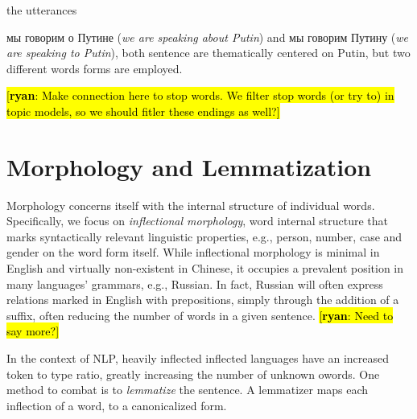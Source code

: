 \documentclass[11pt,letterpaper]{article}
\newcommand{\Note}[3]{\sethlcolor{#2}\hl{[\textbf{#1}: #3]}}
\newcommand{\ryan}[1]{\Note{ryan}{lightorange}{#1}}
\begin{document}
the utterances {{мы говорим о Путине} ({\em we
    are speaking about Putin}) and {{мы
      говорим Путину} ({\em we are speaking to Putin})}, both sentence
  are thematically centered on Putin, but two different words forms
  are employed.

  \ryan{Make connection here to stop words. We filter stop words (or try to) in topic models, so we should
    fitler these endings as well?}
  
\section{Morphology and Lemmatization}\label{sec:inflectional}
Morphology concerns itself with the internal structure of individual
words.  Specifically, we focus on {\em inflectional morphology}, word
internal structure that marks syntactically relevant linguistic
properties, e.g., person, number, case and gender on the word form
itself. While inflectional morphology is minimal in English and
virtually non-existent in Chinese, it occupies a prevalent position in
many languages' grammars, e.g., Russian. In fact, Russian will often
express relations marked in English with prepositions, simply through
the addition of a suffix, often reducing the number of words in a
given sentence.  \ryan{Need to say more?}

In the context of NLP, heavily inflected inflected languages have an
increased token to type ratio, greatly increasing the number of
unknown owords. One method to combat is to {\em lemmatize} the sentence.
A lemmatizer maps each inflection of a word, to a canonicalized form. 


}
\end{document}
